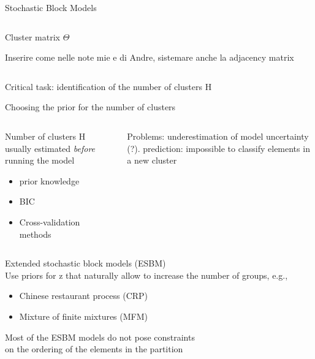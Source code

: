 \begin{frame}{Stochastic Block Models}
\begin{columns}
        \begin{column}{0.25\textwidth}
        \alert{Cluster matrix $\Theta$}

        Inserire come nelle note mie e di Andre, sistemare anche la adjacency matrix
        \end{column}

    \end{columns}



    \begin{center}
    Critical task: \alert{identification of the number of clusters H}
    \end{center}


\end{frame}















\begin{frame}{Choosing the prior for the number of clusters}

\begin{columns}

\begin{column}{0.5\textwidth} 

    Number of clusters H usually estimated \textit{before} running the model
    \begin{itemize}
        \item prior knowledge
        \item BIC
        \item Cross-validation methods
    \end{itemize}
\end{column}

\begin{column}{0.5\textwidth}
    Problems: underestimation of model uncertainty (?). prediction: impossible to classify elements in a new cluster
\end{column}
\end{columns}

\alert{Extended stochastic block models (ESBM)}\\  
Use priors for z that naturally allow to increase the number of groups, e.g., 
    \begin{itemize}
        \item Chinese restaurant process (CRP)
        \item Mixture of finite mixtures (MFM)
    \end{itemize}

Most of the ESBM models do not pose constraints\\ on the \alert{ordering of the elements} in the partition
\end{frame}








